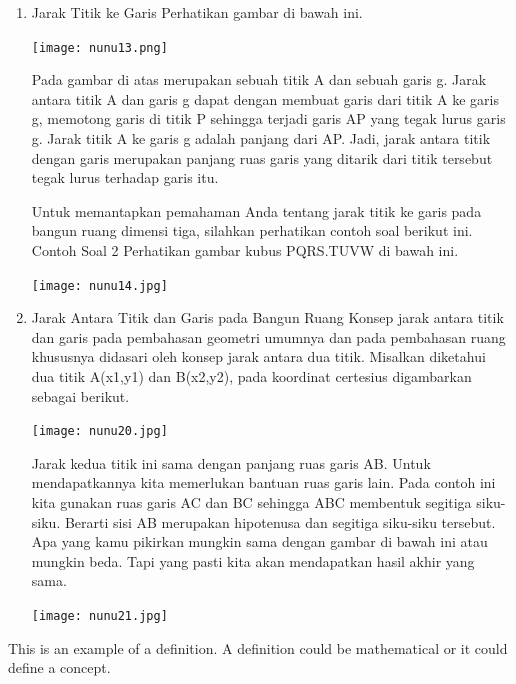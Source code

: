 \documentclass[11pt,fleqn]{book} %
\begin{document}
\begin{enumerate}
\item Jarak Titik ke Garis
Perhatikan gambar di bawah ini.

\begin{center}
\texttt{[image: nunu13.png]}
\end{center}

Pada gambar di atas merupakan sebuah titik A dan sebuah garis g. Jarak antara titik A dan garis g dapat dengan membuat garis dari titik A ke garis g, memotong garis di titik P sehingga terjadi garis AP yang tegak lurus garis g. Jarak titik A ke garis g adalah panjang dari AP. Jadi, jarak antara titik dengan garis merupakan panjang ruas garis yang ditarik dari titik tersebut tegak lurus terhadap garis itu.

Untuk memantapkan pemahaman Anda tentang jarak titik ke garis pada bangun ruang dimensi tiga, silahkan perhatikan contoh soal berikut ini.
Contoh Soal 2
Perhatikan gambar kubus PQRS.TUVW di bawah ini.
\begin{center}
\texttt{[image: nunu14.jpg]}
\end{center}

\item Jarak Antara Titik dan Garis pada Bangun Ruang
Konsep jarak antara titik dan garis pada pembahasan geometri umumnya dan pada pembahasan ruang khususnya didasari oleh konsep jarak antara dua titik. Misalkan diketahui dua titik A(x1,y1) dan B(x2,y2), pada koordinat certesius digambarkan sebagai berikut.

\begin{center}
\texttt{[image: nunu20.jpg]}
\end{center}

Jarak kedua titik ini sama dengan panjang ruas garis AB. Untuk mendapatkannya kita memerlukan bantuan ruas garis lain. Pada contoh ini kita gunakan ruas garis AC dan BC sehingga ABC membentuk segitiga siku-siku. Berarti sisi AB merupakan hipotenusa dan segitiga siku-siku tersebut. Apa yang kamu pikirkan mungkin sama dengan gambar di bawah ini atau mungkin beda. Tapi yang pasti kita akan mendapatkan hasil akhir yang sama.

\begin{center}
\texttt{[image: nunu21.jpg]}
\end{center}


\end{enumerate}



This is an example of a definition. A definition could be mathematical or it could define a concept.
\end{document}
